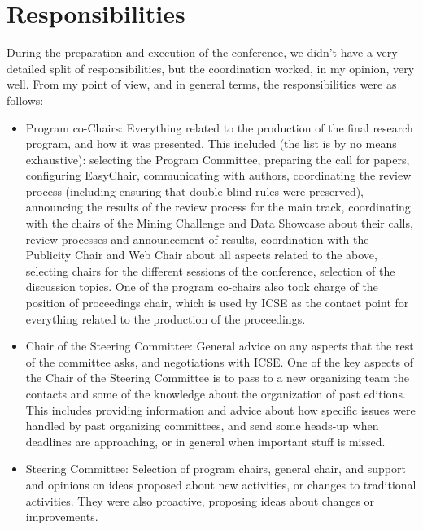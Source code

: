 \documentclass[a4paper]{report}
\begin{document}
\section{Responsibilities}

During the preparation and execution of the conference, we didn't have a very detailed split of responsibilities, but the coordination worked, in my opinion, very well. From my point of view, and in general terms, the responsibilities were as follows:

\begin{itemize}
\item Program co-Chairs: Everything related to the production of the final research program, and how it was presented. This included (the list is by no means exhaustive): selecting the Program Committee, preparing the call for papers, configuring EasyChair, communicating with authors, coordinating the review process (including ensuring that double blind rules were preserved), announcing the results of the review process for the main track, coordinating with the chairs of the Mining Challenge and Data Showcase about their calls, review processes and announcement of results, coordination with the Publicity Chair and Web Chair about all aspects related to the above, selecting chairs for the different sessions of the conference, selection of the discussion topics. One of the program co-chairs also took charge of the position of proceedings chair, which is used by ICSE as the contact point for everything related to the production of the proceedings.
  
\item Chair of the Steering Committee: General advice on any aspects that the rest of the committee asks, and negotiations with ICSE. One of the key aspects of the Chair of the Steering Committee is to pass to a new organizing team the contacts and some of the knowledge about the organization of past editions. This includes providing information and advice about how specific issues were handled by past organizing committees, and send some heads-up when deadlines are approaching, or in general when important stuff is missed.
  
\item Steering Committee: Selection of program chairs, general chair, and support and opinions on ideas proposed about new activities, or changes to traditional activities. They were also proactive, proposing ideas about changes or improvements.


\end{itemize}
\end{document}
